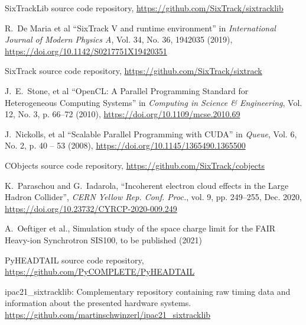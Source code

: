 \documentclass[a4paper,
               refpage,       %
               keeplastbox,   %
               ]{jacow}
\begin{document}
%
%
%
	{\printbibliography}%
	{%
	
	\begin{thebibliography}{99}   %
	
		SixTrackLib source code repository, \newline
		\url{https://github.com/SixTrack/sixtracklib}

        R.~De Maria et al ``SixTrack V and runtime environment'' in 
        \textit{International Journal of Modern Physics A}, Vol. 34, No. 36, 1942035 (2019), \newline
        \url{https://doi.org/10.1142/S0217751X19420351}

		SixTrack source code repository, \newline
		\url{https://github.com/SixTrack/sixtrack}
		
        J.~E.~Stone, et al ``{OpenCL}: {{A Parallel Programming Standard}} for {{Heterogeneous Computing Systems}}'' in \textit{Computing in Science \& Engineering}, Vol. 12, No. 3, p. 66--72 (2010),  \newline
        \url{https://doi.org/10.1109/mcse.2010.69}
        
        J.~Nickolls, et al ``Scalable {{Parallel Programming}} with {{CUDA}}'' in 
        \textit{Queue}, Vol. 6, No. 2, p. 40 -- 53 (2008),  \newline
        \url{https://doi.org/10.1145/1365490.1365500}
        
        CObjects source code repository,  \newline
        \url{https://github.com/SixTrack/cobjects}
        
        K.~Paraschou and G.~Iadarola,
        ``Incoherent electron cloud effects in the Large Hadron Collider'',
        \emph{CERN Yellow Rep. Conf. Proc.}, vol. 9, pp. 249--255, Dec. 2020, \newline
        \url{https://doi.org/10.23732/CYRCP-2020-009.249}
        
        A.~Oeftiger et al., Simulation study of the space charge limit for the FAIR Heavy-ion Synchrotron SIS100, to be published (2021)
        
        PyHEADTAIL source code repository,\newline
        \url{https://github.com/PyCOMPLETE/PyHEADTAIL}
        
        ipac21\_sixtracklib: Complementary repository containing raw timing data and
        information about the presented hardware systems.\newline 
        \url{https://github.com/martinschwinzerl/ipac21_sixtracklib}
	\end{thebibliography}
} %
%
% 

\end{document}
